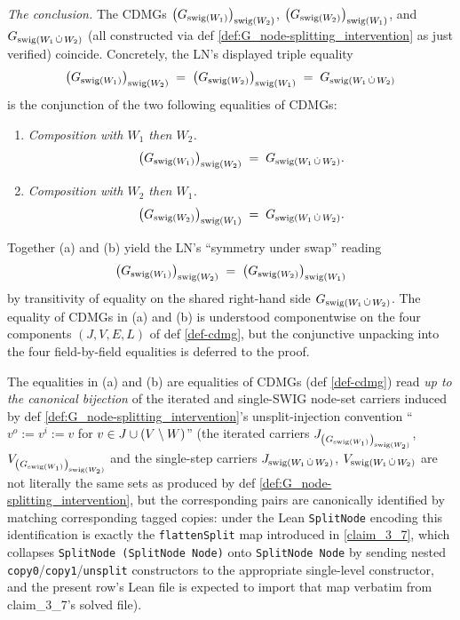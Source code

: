 \documentclass[main]{subfiles}
\begin{document}
\begin{Lem}
    \emph{The conclusion.}
    The CDMGs $\left ( G_{\mathrm{swig}(W_1)} \right )_{\mathrm{swig}(W_2)}$, $\left ( G_{\mathrm{swig}(W_2)} \right )_{\mathrm{swig}(W_1)}$, and $G_{\mathrm{swig}(W_1 \,\dot{\cup}\, W_2)}$ (all constructed via def \ref{def:G_node-splitting_intervention} as just verified) coincide. Concretely, the LN's displayed triple equality
    \[ \left ( G_{\mathrm{swig}(W_1)} \right )_{\mathrm{swig}(W_2)} \;=\; \left ( G_{\mathrm{swig}(W_2)} \right )_{\mathrm{swig}(W_1)} \;=\; G_{\mathrm{swig}(W_1 \,\dot{\cup}\, W_2)} \]
    is the conjunction of the two following equalities of CDMGs:
    \begin{enumerate}[label=(\alph*)]
        \item \emph{Composition with $W_1$ then $W_2$.}
              \[ \left ( G_{\mathrm{swig}(W_1)} \right )_{\mathrm{swig}(W_2)} \;=\; G_{\mathrm{swig}(W_1 \,\dot{\cup}\, W_2)}. \]
        \item \emph{Composition with $W_2$ then $W_1$.}
              \[ \left ( G_{\mathrm{swig}(W_2)} \right )_{\mathrm{swig}(W_1)} \;=\; G_{\mathrm{swig}(W_1 \,\dot{\cup}\, W_2)}. \]
    \end{enumerate}
    Together (a) and (b) yield the LN's ``symmetry under swap'' reading
    \[ \left ( G_{\mathrm{swig}(W_1)} \right )_{\mathrm{swig}(W_2)} \;=\; \left ( G_{\mathrm{swig}(W_2)} \right )_{\mathrm{swig}(W_1)} \]
    by transitivity of equality on the shared right-hand side $G_{\mathrm{swig}(W_1 \,\dot{\cup}\, W_2)}$. The equality of CDMGs in (a) and (b) is understood componentwise on the four components $(J, V, E, L)$ of def \ref{def-cdmg}, but the conjunctive unpacking into the four field-by-field equalities is deferred to the proof.

    The equalities in (a) and (b) are equalities of CDMGs (def \ref{def-cdmg}) read \emph{up to the canonical bijection} of the iterated and single-SWIG node-set carriers induced by def \ref{def:G_node-splitting_intervention}'s unsplit-injection convention ``$v^o := v^i := v$ for $v \in J \cup (V \setminus W)$'' (the iterated carriers $J_{\left ( G_{\mathrm{swig}(W_1)} \right )_{\mathrm{swig}(W_2)}}$, $V_{\left ( G_{\mathrm{swig}(W_1)} \right )_{\mathrm{swig}(W_2)}}$ and the single-step carriers $J_{\mathrm{swig}(W_1 \,\dot{\cup}\, W_2)}$, $V_{\mathrm{swig}(W_1 \,\dot{\cup}\, W_2)}$ are not literally the same sets as produced by def \ref{def:G_node-splitting_intervention}, but the corresponding pairs are canonically identified by matching corresponding tagged copies: under the Lean \texttt{SplitNode} encoding this identification is exactly the \texttt{flattenSplit} map introduced in \ref{claim_3_7}, which collapses \texttt{SplitNode (SplitNode Node)} onto \texttt{SplitNode Node} by sending nested \texttt{copy0}/\texttt{copy1}/\texttt{unsplit} constructors to the appropriate single-level constructor, and the present row's Lean file is expected to import that map verbatim from claim_3_7's solved file).
\end{Lem}
\end{document}
